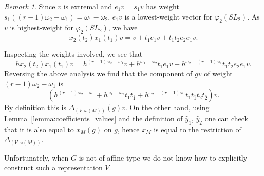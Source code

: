 \documentclass[12pt]{amsart}
\newcommand{\gv}{\omega}
\newcommand{\grep}{\gv}
\newcommand{\ol}[1]{\overline{#1}}
\theoremstyle{remark}
\newtheorem{remark}[theorem]{Remark}
\numberwithin{equation}{section}
\numberwithin{figure}{section}
\begin{document}
\begin{remark}
  Since $v$ is extremal and $e_1v = \ol{s_1}v$ has weight $s_1((r-1) \omega_2 - \omega_1) = \omega_1 - \omega_2$, $e_1v$ is a lowest-weight vector for $\varphi_2(SL_2)$.
  As $v$ is highest-weight for $\varphi_2(SL_2)$, we have
  \[
    x_2(t_2)x_1(t_1)v = v + t_1e_1v + t_1t_2e_2e_1v.
  \]

  Inspecting the weights involved, we see that
  \[
    hx_2(t_2)x_1(t_1)v = h^{(r-1) \omega_2 - \omega_1}v + h^{\omega_1-\omega_2}t_1e_1v + h^{\omega_2 - (r-1)\omega_1}t_1t_2e_2e_1v.
  \]
  Reversing the above analysis we find that the component of $gv$ of weight $(r-1)\omega_2 - \omega_1$ is
  \[
    (h^{(r-1) \omega_2 - \omega_1} + h^{\omega_1-\omega_2}t_1t_{\ol{1}} + h^{\omega_2 - (r-1)\omega_1}t_1t_{\ol{1}}t_2t_{\ol{2}})v.
  \]
  By definition this is $\Delta_{(V,\grep(M))}(g)v$.
  On the other hand, using Lemma~\ref{lemma:coefficients_values} and the definition of $\hat{y}_1$, $\hat{y}_2$ one can check that it is also equal to $x_M(g)$ on $g$, hence $x_M$ is equal to the restriction of $\Delta_{(V,\grep(M))}$.

  Unfortunately, when $G$ is not of affine type we do not know how to explicitly construct such a representation $V$.
\end{remark}



\end{document}
